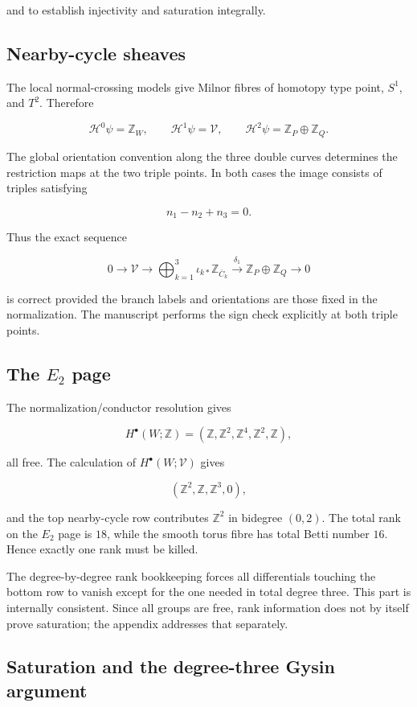 \documentclass[
  10pt,
  letterpaper,
]{article}
\newcommand{\Z}{\mathbb Z}
\begin{document}
and to establish injectivity and saturation integrally.

\subsection{Nearby-cycle sheaves}\label{nearby-cycle-sheaves}

The local normal-crossing models give Milnor fibres of homotopy type
point, \(S^1\), and \(T^2\). Therefore

\[
\mathcal H^0\psi=\Z_W,
\qquad
\mathcal H^1\psi=\mathcal V,
\qquad
\mathcal H^2\psi=\Z_P\oplus\Z_Q.
\]

The global orientation convention along the three double curves
determines the restriction maps at the two triple points. In both cases
the image consists of triples satisfying

\[
n_1-n_2+n_3=0.
\]

Thus the exact sequence

\[
0\to\mathcal V\to\bigoplus_{k=1}^3\iota_{k*}\Z_{\bar C_k}
\xrightarrow{\delta_1}\Z_P\oplus\Z_Q\to0
\]

is correct provided the branch labels and orientations are those fixed
in the normalization. The manuscript performs the sign check explicitly
at both triple points.

\subsection{\texorpdfstring{The \(E_2\)
page}{The E\_2 page}}\label{the-e_2-page}

The normalization/conductor resolution gives

\[
H^\bullet(W;\Z)=(\Z,\Z^2,\Z^4,\Z^2,\Z),
\]

all free. The calculation of \(H^\bullet(W;\mathcal V)\) gives

\[
(\Z^2,\Z,\Z^3,0),
\]

and the top nearby-cycle row contributes \(\Z^2\) in bidegree \((0,2)\).
The total rank on the \(E_2\) page is \(18\), while the smooth torus
fibre has total Betti number \(16\). Hence exactly one rank must be
killed.

The degree-by-degree rank bookkeeping forces all differentials touching
the bottom row to vanish except for the one needed in total degree
three. This part is internally consistent. Since all groups are free,
rank information does not by itself prove saturation; the appendix
addresses that separately.

\subsection{Saturation and the degree-three Gysin
argument}\label{saturation-and-the-degree-three-gysin-argument}
\end{document}
